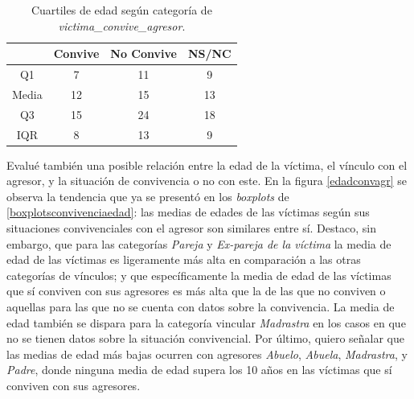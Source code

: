\documentclass[10 pt]{article}
\begin{document}
\begin{table}[H]
    \begin{center}
    \caption{Cuartiles de edad según categoría de \textit{victima\_convive\_agresor}.}
    \label{cuartilesconviveedad}
    \begin{tabular}{cccc}
    \hline
    \multicolumn{1}{r}{\textbf{}} & \textbf{Convive} & \textbf{No Convive} & \textbf{ NS/NC} \\ \hline
    Q1                            & 7                    & 11                   & 9                       \\
    Media                         & 12                   & 15                   & 13                      \\
    Q3                            & 15                   & 24                   & 18                      \\
    IQR                           & 8                   & 13                   & 9                     \\ \hline
    \end{tabular}
    \end{center}
    \end{table}


Evalué también una posible relación entre la edad de la víctima, el vínculo con el agresor, y la situación de convivencia o no con este. En la figura \ref{edadconvagr} se observa la tendencia que ya se presentó en los \textit{boxplots} de \ref{boxplotsconvivenciaedad}: las medias de edades de las víctimas según sus situaciones convivenciales con el agresor son similares entre sí. Destaco, sin embargo, que para las categorías \textit{Pareja} y \textit{Ex-pareja de la víctima} la media de edad de las víctimas es ligeramente más alta en comparación a las otras categorías de vínculos; y que específicamente la media de edad de las víctimas que sí conviven con sus agresores es más alta que la de las que no conviven o aquellas para las que no se cuenta con datos sobre la convivencia. La media de edad también se dispara para la categoría vincular \textit{Madrastra} en los casos en que no se tienen datos sobre la situación convivencial. Por último, quiero señalar que las medias de edad más bajas ocurren con agresores \textit{Abuelo}, \textit{Abuela}, \textit{Madrastra}, y \textit{Padre}, donde ninguna media de edad supera los 10 años en las víctimas que sí conviven con sus agresores.
\end{document}
